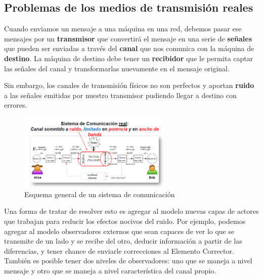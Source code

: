 \subsection{Problemas de los medios de transmisión reales}
Cuando enviamos un mensaje a una máquina en una red, debemos pasar ese mensajes por un \textbf{transmisor} que convertirá el mensaje en una serie de \textbf{señales} que pueden ser enviadas a través del \textbf{canal} que nos comunica con la máquina de \textbf{destino}. La máquina de destino debe tener un \textbf{recibidor} que le permita captar las señales del canal y transformarlas nuevamente en el mensaje original.

Sin embargo, los canales de transmisión físicos no son perfectos y aportan \textbf{ruido} a las señales emitidas por nuestro transmisor pudiendo llegar a destino con errores.

\begin{figure}[H]
	\centering
	\includegraphics[width=0.65\textwidth
]{images/sistema-comunicacion-real.png}
	\caption[Esquema general de un sistema de comunicación]{Esquema general de un sistema de comunicación}
	\label{fig:sistema-comunicacion-correccion}
\end{figure}

Una forma de tratar de resolver esto es agregar al modelo nuevas capas de actores que trabajan para reducir los efectos nocivos del ruido. Por ejemplo, podemos agregar al modelo observadores externos que sean capaces de ver lo que se transmite de un lado y se recibe del otro, deducir información a partir de las diferencias, y tener chance de enviarle
correcciones al Elemento Corrector. También es posible tener dos niveles de observadores:
uno que se maneja a nivel mensaje y otro que se maneja a nivel característica del canal
propio.

